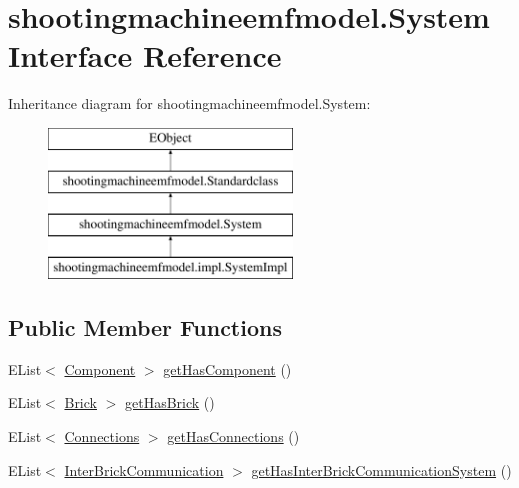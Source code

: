 \hypertarget{interfaceshootingmachineemfmodel_1_1_system}{\section{shootingmachineemfmodel.\-System Interface Reference}
\label{interfaceshootingmachineemfmodel_1_1_system}
}
Inheritance diagram for shootingmachineemfmodel.\-System\-:\begin{figure}[H]
\begin{center}
\leavevmode
\includegraphics[height=4.000000cm]{interfaceshootingmachineemfmodel_1_1_system}
\end{center}
\end{figure}
\subsection*{Public Member Functions}
\begin{DoxyCompactItemize}
\item 
E\-List$<$ \hyperlink{interfaceshootingmachineemfmodel_1_1_component}{Component} $>$ \hyperlink{interfaceshootingmachineemfmodel_1_1_system_a27393713969590fd1f19fac306dc11cb}{get\-Has\-Component} ()
\item 
E\-List$<$ \hyperlink{interfaceshootingmachineemfmodel_1_1_brick}{Brick} $>$ \hyperlink{interfaceshootingmachineemfmodel_1_1_system_aa0ce60e0661fd3c3fa7e8ce5fdaa80a6}{get\-Has\-Brick} ()
\item 
E\-List$<$ \hyperlink{interfaceshootingmachineemfmodel_1_1_connections}{Connections} $>$ \hyperlink{interfaceshootingmachineemfmodel_1_1_system_ac25cc6f732870aa54874382f229f8f3a}{get\-Has\-Connections} ()
\item 
E\-List$<$ \hyperlink{interfaceshootingmachineemfmodel_1_1_inter_brick_communication}{Inter\-Brick\-Communication} $>$ \hyperlink{interfaceshootingmachineemfmodel_1_1_system_a9ce40065c484eb9f1630ca0a80c5cebf}{get\-Has\-Inter\-Brick\-Communication\-System} ()
\end{DoxyCompactItemize}


